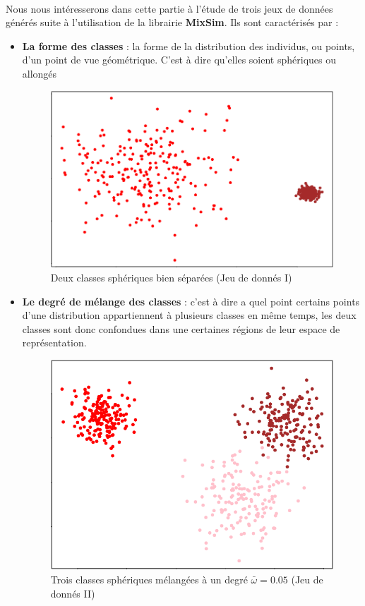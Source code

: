 \paragraph{}
Nous nous intéresserons dans cette partie à l'étude de trois jeux de données générés suite à l'utilisation de la librairie \textbf{MixSim}. Ils sont caractérisés par :
\begin{itemize}
	\item \textbf{La forme des classes} : la forme de la distribution des individus, ou points, d'un point de vue géométrique. C'est à dire qu'elles soient sphériques ou allongés
	\begin{figure}[H]
		\centering
		\includegraphics[width=0.5\linewidth]{images/spherical_classes.png}
		\caption{Deux classes sphériques bien séparées (Jeu de donnés I)}
		\label{fig:spherical}
	\end{figure}
	
	\item \textbf{Le degré de mélange des classes} : c'est à dire a quel point certains points d'une distribution appartiennent à plusieurs classes en même temps, les deux classes sont donc confondues dans une certaines régions de leur espace de représentation.
	
	\begin{figure}[H]
		\centering
		\includegraphics[width=0.5\linewidth]{images/spherical_classes_mixed.png}
		\caption{Trois classes sphériques mélangées à un degré $\bar{\omega} = 0.05$ (Jeu de donnés II)}
	\end{figure}


\end{itemize}
